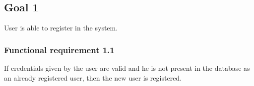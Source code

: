 \subsection{Goal 1}
User is able to register in the system.

\setcounter{secnumdepth}{3}
\subsubsection{Functional requirement 1.1}
If credentials given by the user are valid and he is not present in the database as an already registered user, then the new user is registered.
